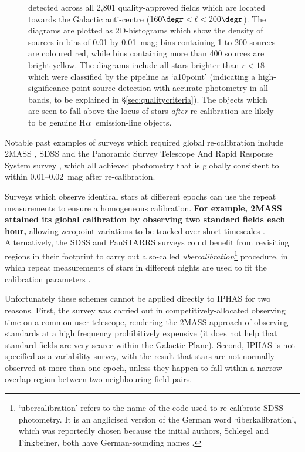 \documentclass[a4paper,useAMS,usenatbib]{mn2e}
\def\ha{\mbox{H$\rm \alpha$}}
\begin{document}
\begin{figure}
{         detected across all 2,801 quality-approved fields
         which are located towards the Galactic anti-centre
         ($160\degr<\ell<200\degr$).
         The diagrams are plotted as 2D-histograms
         which show the density of sources
         in bins of 0.01-by-0.01~mag;
         bins containing 1 to 200 sources are coloured red,
         while bins containing more than 400 sources are bright yellow.
         The diagrams include all stars
         brighter than $r<18$ which were
         classified by the pipeline as `a10point'
         (indicating a high-significance point source detection with
         accurate photometry in all bands,
         to be explained in \S\ref{sec:qualitycriteria}).
         The objects which are seen to fall above the locus of stars
         \emph{after} re-calibration 
         are likely to be genuine \ha\ emission-line objects.}
\end{figure}

Notable past examples of surveys which required
global re-calibration include 
2MASS \citep{Nikolaev2000},
SDSS \citep{Padmanabhan2008}
and the Panoramic Survey Telescope 
And Rapid Response System survey \citep[Pan-STARRS;][]{Schlafly2012},
which all achieved photometry 
that is globally consistent to within 0.01--0.02~mag
after re-calibration.

Surveys which observe identical stars at different epochs
can use the repeat measurements to ensure a homogeneous calibration.
{\bf For example, 2MASS attained its global calibration
by observing two standard fields each hour, }
allowing zeropoint variations to be tracked 
over short timescales \citep{Nikolaev2000}.
Alternatively, the SDSS and PanSTARRS surveys could benefit
from revisiting regions in their footprint to 
carry out a so-called \emph{ubercalibration}\footnote{`ubercalibration'
refers to the name of the code used to re-calibrate SDSS photometry. 
It is an anglicised version of the German word `\"uberkalibration',
which was reportedly chosen because the initial authors, Schlegel and Finkbeiner, both
have German-sounding names \citep{Finkbeiner2010}.} procedure,
in which repeat measurements of stars in different nights
are used to fit the calibration parameters
\citep{Ivezic2007,Padmanabhan2008,Schlafly2012}.

Unfortunately these schemes cannot be applied
directly to IPHAS
for two reasons. 
First, the survey was carried out 
in competitively-allocated observing time on a
common-user telescope, 
rendering the 2MASS approach 
of observing standards at a high frequency
prohibitively expensive (it does not help that 
standard fields are very scarce within the Galactic Plane).
Second, IPHAS is not specified as a variability survey,
with the result that stars are not normally observed
at more than one epoch,
unless they happen to fall within a narrow overlap region 
between two neighbouring field pairs.
\end{document}
